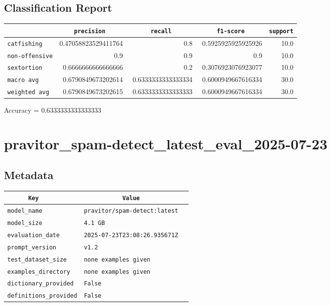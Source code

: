 \documentclass{article}
\begin{document}
\subsection{Classification Report}

\begin{center}
\begin{tabular}{l | r | r | r | r} \hline
    \verb|            | & \verb|    precision     | & \verb|      recall      | & \verb|     f1-score     | & \verb|support| \\ \hline
    \hline
    \verb|catfishing | & 0.47058823529411764 & 0.8 & 0.5925925925925926 &    10.0 \\ \hline
    \verb|non-offensive| & 0.9 & 0.9 & 0.9 &    10.0 \\ \hline
    \verb|sextortion | & 0.6666666666666666 & 0.2 & 0.3076923076923077 &    10.0 \\ \hline
    \verb|macro avg  | & 0.6790849673202614 & 0.6333333333333334 & 0.6000949667616334 &    30.0 \\ \hline
    \verb|weighted avg| & 0.6790849673202615 & 0.6333333333333333 & 0.6000949667616334 &    30.0 \\ \hline
\end{tabular}
\end{center}

\begin{center}
Accuracy = 0.6333333333333333
\end{center}

\section{pravitor\_spam-detect\_latest\_eval\_2025-07-23}
\subsection{Metadata}

\begin{center}
\begin{tabular}{l | l} \hline
    \verb|      Key      | & \verb|           Value           | \\ \hline
    \hline
    \verb|model_name    | & \verb|pravitor/spam-detect:latest  | \\ \hline
    \verb|model_size    | & \verb|4.1 GB                       | \\ \hline
    \verb|evaluation_date| & \verb|2025-07-23T23:08:26.935671Z  | \\ \hline
    \verb|prompt_version| & \verb|v1.2                         | \\ \hline
    \verb|test_dataset_size| & \verb|none examples given          | \\ \hline
    \verb|examples_directory| & \verb|none examples given          | \\ \hline
    \verb|dictionary_provided| & \verb|False                        | \\ \hline
    \verb|definitions_provided| & \verb|False                        | \\ \hline
\end{tabular}
\end{center}
\end{document}
